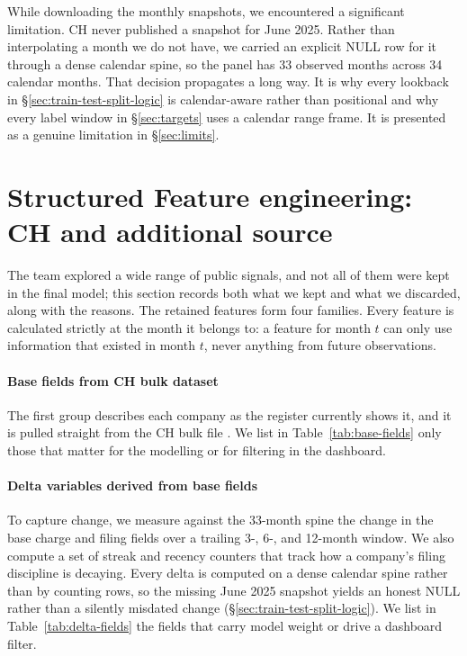 \documentclass[    author={Samuel Menon Demelo; Sneha Saphala Ram Prasad; 
Viktor Ander Lindholm; Vishal Khatri},
               supervisor={Prof. Fernando Moreno-Pino},
                   degree={MSc},
                    title={Lloyds Commercial Banking Intelligence},
                 subtitle={Ranking SME Lending, Risk and Growth Prospects for Lloyds Banking Group},
                     type={},
                     year={2026}]{dissertation}
\newcommand{\note}[1]{}
\begin{document}
While downloading the monthly snapshots, we encountered a significant limitation. CH never published a snapshot for June 2025. Rather than interpolating a month we do not have, we carried an explicit NULL row for it through a dense calendar spine, so the panel has 33 observed months across 34 calendar months. That decision propagates a long way. It is why every lookback in \S\ref{sec:train-test-split-logic} is calendar-aware rather than positional and why every label window in \S\ref{sec:targets} uses a calendar range frame. It is presented as a genuine limitation in \S\ref{sec:limits}.

\section{Structured Feature engineering: CH and additional source}
\note{Summarise `reports/dashboard_handover_columns.md`}
The team explored a wide range of public signals, and not all of them were kept in the final model; this section records both what we kept and what we discarded, along with the reasons. The retained features form four families. Every feature is calculated strictly at the month it belongs to: a feature for month $t$ can only use information that existed in month $t$, never anything from future observations.

\paragraph{Base fields from CH bulk dataset}
The first group describes each company as the register currently shows it, and it is pulled straight from the CH bulk file \cite{companieshouse_api}. We list in Table~\ref{tab:base-fields} only those that matter for the modelling or for filtering in the dashboard.

\paragraph{Delta variables derived from base fields}
To capture change, we measure against the 33-month spine the change in the base charge and filing fields over a trailing 3-, 6-, and 12-month window. We also compute a set of streak and recency counters that track how a company's filing discipline
is decaying. Every delta is computed on a dense calendar spine rather than by counting rows, so the missing June 2025 snapshot yields an honest NULL rather than a silently misdated change (\S\ref{sec:train-test-split-logic}). We list in Table~\ref{tab:delta-fields} the fields that carry model weight or drive a dashboard filter.
\end{document}
